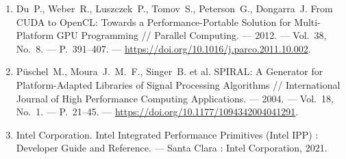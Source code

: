 \documentclass[14pt,a4paper]{extarticle}
\begin{document}
\begin{enumerate}
  \item Du~P., Weber~R., Luszczek~P., Tomov~S., Peterson~G.,
        Dongarra~J. From CUDA to OpenCL: Towards a Performance-Portable
        Solution for Multi-Platform GPU Programming // Parallel
        Computing. --- 2012. --- Vol.~38, No.~8. --- P.~391--407. ---
        \url{https://doi.org/10.1016/j.parco.2011.10.002}.

  \item P\"uschel~M., Moura~J.~M.~F., Singer~B. et al. SPIRAL: A
        Generator for Platform-Adapted Libraries of Signal Processing
        Algorithms // International Journal of High Performance
        Computing Applications. --- 2004. --- Vol.~18, No.~1. ---
        P.~21--45. ---
        \url{https://doi.org/10.1177/1094342004041291}.

  \item Intel Corporation. Intel Integrated Performance Primitives
        (Intel IPP) : Developer Guide and Reference. --- Santa Clara :
        Intel Corporation, 2021.
\end{enumerate}
\end{document}
